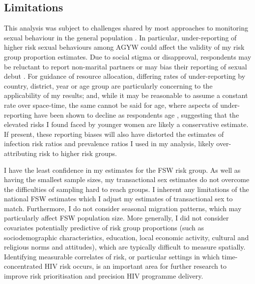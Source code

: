 \documentclass[a4paper, nobind]{templates/ociamthesis}
\begin{document}
\hypertarget{limitations}{%
\subsection{Limitations}\label{limitations}}

This analysis was subject to challenges shared by most approaches to monitoring sexual behaviour in the general population \autocite{cleland2004monitoring}.
In particular, under-reporting of higher risk sexual behaviours among AGYW could affect the validity of my risk group proportion estimates.
Due to social stigma or disapproval, respondents may be reluctant to report non-marital partners \autocite{nnko2004secretive,helleringer2011reliability} or may bias their reporting of sexual debut \autocite{zaba2004age,wringe2009comparative,nguyen2022trends}.
For guidance of resource allocation, differing rates of under-reporting by country, district, year or age group are particularly concerning to the applicability of my results; and, while it may be reasonable to assume a constant rate over space-time, the same cannot be said for age, where aspects of under-reporting have been shown to decline as respondents age \autocite{glynn2011assessing}, suggesting that the elevated risks I found faced by younger women are likely a conservative estimate.
If present, these reporting biases will also have distorted the estimates of infection risk ratios and prevalence ratios I used in my analysis, likely over-attributing risk to higher risk groups.

I have the least confidence in my estimates for the FSW risk group.
As well as having the smallest sample sizes, my transactional sex estimates do not overcome the difficulties of sampling hard to reach groups.
I inherent any limitations of the national FSW estimates \autocite{stevens2022estimating} which I adjust my estimates of transactional sex to match.
Furthermore, I do not consider seasonal migration patterns, which may particularly affect FSW population size.
More generally, I did not consider covariates potentially predictive of risk group proportions (such as sociodemographic characteristics, education, local economic activity, cultural and religious norms and attitudes), which are typically difficult to measure spatially.
Identifying measurable correlates of risk, or particular settings in which time-concentrated HIV risk occurs, is an important area for further research to improve risk prioritisation and precision HIV programme delivery.
\end{document}
